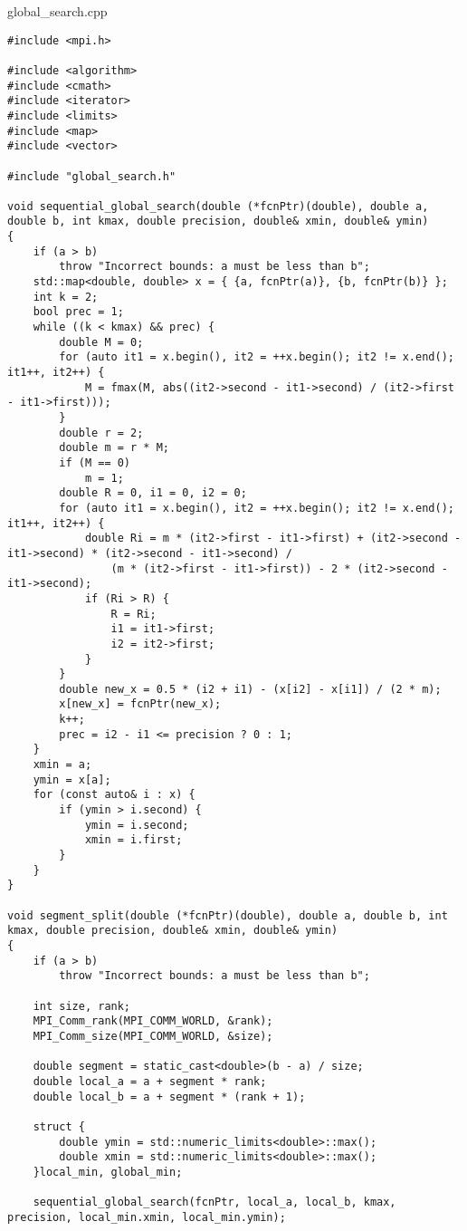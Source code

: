 \documentclass{report}
\begin{document}
global\_search.cpp
\begin{lstlisting}
#include <mpi.h>

#include <algorithm>
#include <cmath>
#include <iterator>
#include <limits>
#include <map>
#include <vector>

#include "global_search.h"

void sequential_global_search(double (*fcnPtr)(double), double a, double b, int kmax, double precision, double& xmin, double& ymin)
{
    if (a > b)
        throw "Incorrect bounds: a must be less than b";
    std::map<double, double> x = { {a, fcnPtr(a)}, {b, fcnPtr(b)} };
    int k = 2;
    bool prec = 1;
    while ((k < kmax) && prec) {
        double M = 0;
        for (auto it1 = x.begin(), it2 = ++x.begin(); it2 != x.end(); it1++, it2++) {
            M = fmax(M, abs((it2->second - it1->second) / (it2->first - it1->first)));
        }
        double r = 2;
        double m = r * M;
        if (M == 0)
            m = 1;
        double R = 0, i1 = 0, i2 = 0;
        for (auto it1 = x.begin(), it2 = ++x.begin(); it2 != x.end(); it1++, it2++) {
            double Ri = m * (it2->first - it1->first) + (it2->second - it1->second) * (it2->second - it1->second) /
                (m * (it2->first - it1->first)) - 2 * (it2->second - it1->second);
            if (Ri > R) {
                R = Ri;
                i1 = it1->first;
                i2 = it2->first;
            }
        }
        double new_x = 0.5 * (i2 + i1) - (x[i2] - x[i1]) / (2 * m);
        x[new_x] = fcnPtr(new_x);
        k++;
        prec = i2 - i1 <= precision ? 0 : 1;
    }
    xmin = a;
    ymin = x[a];
    for (const auto& i : x) {
        if (ymin > i.second) {
            ymin = i.second;
            xmin = i.first;
        }
    }
}

void segment_split(double (*fcnPtr)(double), double a, double b, int kmax, double precision, double& xmin, double& ymin)
{
    if (a > b)
        throw "Incorrect bounds: a must be less than b";

    int size, rank;
    MPI_Comm_rank(MPI_COMM_WORLD, &rank);
    MPI_Comm_size(MPI_COMM_WORLD, &size);

    double segment = static_cast<double>(b - a) / size;
    double local_a = a + segment * rank;
    double local_b = a + segment * (rank + 1);

    struct {
        double ymin = std::numeric_limits<double>::max();
        double xmin = std::numeric_limits<double>::max();
    }local_min, global_min;

    sequential_global_search(fcnPtr, local_a, local_b, kmax, precision, local_min.xmin, local_min.ymin);


\end{lstlisting}
\end{document}

